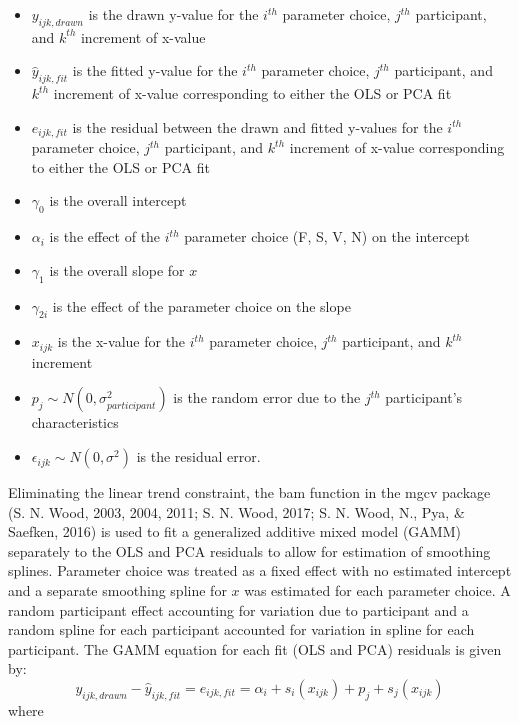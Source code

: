 \documentclass[print]{nuthesis}
\providecommand{\tightlist}{%
  \setlength{\itemsep}{0pt}\setlength{\parskip}{0pt}}
\begin{document}
\begin{itemize}
\tightlist
\item
  \(y_{ijk,drawn}\) is the drawn y-value for the \(i^{th}\) parameter choice, \(j^{th}\) participant, and \(k^{th}\) increment of x-value
\item
  \(\hat y_{ijk,fit}\) is the fitted y-value for the \(i^{th}\) parameter choice, \(j^{th}\) participant, and \(k^{th}\) increment of x-value corresponding to either the OLS or PCA fit
\item
  \(e_{ijk,fit}\) is the residual between the drawn and fitted y-values for the \(i^{th}\) parameter choice, \(j^{th}\) participant, and \(k^{th}\) increment of x-value corresponding to either the OLS or PCA fit
\item
  \(\gamma_0\) is the overall intercept
\item
  \(\alpha_i\) is the effect of the \(i^{th}\) parameter choice (F, S, V, N) on the intercept
\item
  \(\gamma_1\) is the overall slope for \(x\)
\item
  \(\gamma_{2i}\) is the effect of the parameter choice on the slope
\item
  \(x_{ijk}\) is the x-value for the \(i^{th}\) parameter choice, \(j^{th}\) participant, and \(k^{th}\) increment
\item
  \(p_{j} \sim N(0, \sigma^2_{participant})\) is the random error due to the \(j^{th}\) participant's characteristics
\item
  \(\epsilon_{ijk} \sim N(0, \sigma^2)\) is the residual error.
\end{itemize}

Eliminating the linear trend constraint, the bam function in the mgcv package (S. N. Wood, 2003, 2004, 2011; S. N. Wood, 2017; S. N. Wood, N., Pya, \& Saefken, 2016) is used to fit a generalized additive mixed model (GAMM) separately to the OLS and PCA residuals to allow for estimation of smoothing splines.
Parameter choice was treated as a fixed effect with no estimated intercept and a separate smoothing spline for \(x\) was estimated for each parameter choice. A random participant effect accounting for variation due to participant and a random spline for each participant accounted for variation in spline for each participant.
The GAMM equation for each fit (OLS and PCA) residuals is given by:
\begin{equation}
y_{ijk, drawn} - \hat y_{ijk, fit} = e_{ijk,fit} = \alpha_i + s_{i}(x_{ijk}) + p_{j} + s_{j}(x_{ijk})
\end{equation}
\noindent where
\end{document}
